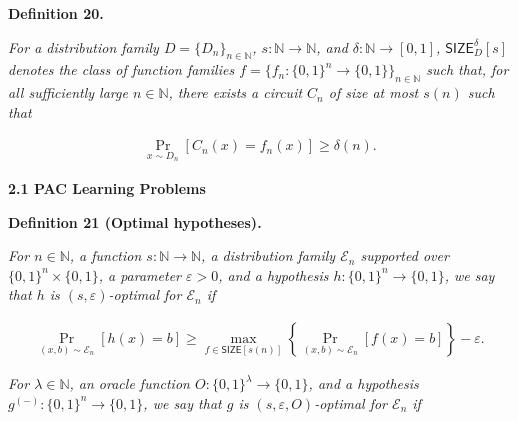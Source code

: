 



\par\medskip\noindent\textbf{
\textbf{Definition 20}\textbf{.}
}\par



\emph{For a distribution family $D=\{D_{n}\}_{n\in\mathbb{N}}$, $s:\mathbb{N}\to\mathbb{N}$, and $\delta:\mathbb{N}\to[0,1]$, ${\mathsf{SIZE}}_{D}^{\delta}[s]$ denotes the class of function families $f=\{f_{n}:\{0,1\}^{n}\to\{0,1\}\}_{n\in\mathbb{N}}$ such that, for all sufficiently large $n\in\mathbb{N}$, there exists a circuit $C_{n}$ of size at most $s(n)$ such that}\par


\[\begin{gathered}
\Pr_{x\sim D_{n}}[C_{n}(x)=f_{n}(x)]\geq\delta(n).
\end{gathered}\]






\par\medskip\noindent\textbf{
2.1 PAC Learning Problems}\par





\par\medskip\noindent\textbf{
\textbf{Definition 21}\textbf{ }(Optimal hypotheses)\textbf{.}
}\par



\emph{For $n\in\mathbb{N}$, a function $s:\mathbb{N}\to\mathbb{N}$, a distribution family $\mathcal{E}_{n}$ supported over $\{0,1\}^{n}\times\{0,1\}$, a parameter $\varepsilon>0$, and a hypothesis $h:\{0,1\}^{n}\to\{0,1\}$, we say that $h$ is $(s,\varepsilon)$-optimal for $\mathcal{E}_{n}$ if}\par


\[\begin{gathered}
\Pr_{(x,b)\sim\mathcal{E}_{n}}[h(x)=b]\geq\max_{f\in{\mathsf{SIZE}}[s(n)]}\left\{\Pr_{(x,b)\sim\mathcal{E}_{n}}[f(x)=b]\right\}-\varepsilon.
\end{gathered}\]




\emph{For $\lambda\in\mathbb{N}$, an oracle function $O:\{0,1\}^{\lambda}\to\{0,1\}$, and a hypothesis $g^{(-)}:\{0,1\}^{n}\to\{0,1\}$, we say that $g$ is $(s,\varepsilon,O)$-optimal for $\mathcal{E}_{n}$ if}\par


